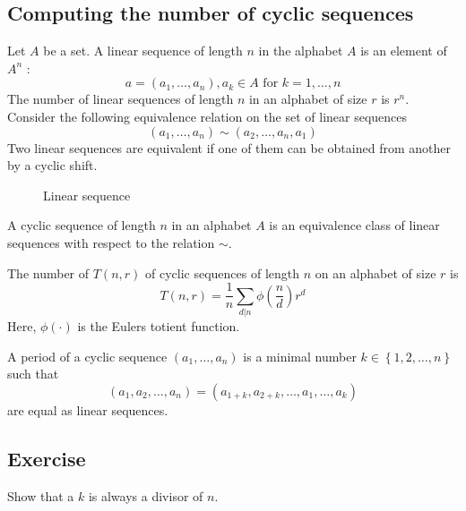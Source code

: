 \documentclass[../main.tex]{subfiles}
\begin{document}
\subsection{Computing the number of cyclic sequences}
\begin{defn}
	Let $A$ be a set. A linear sequence of length $n$ in the alphabet $A$ is an element of $A^{n}$ :
	\[ 
		a= ( a_1, \ldots, a_n) , a_k \in A  \text{ for }  k=1, \ldots,n
	\]
The number of linear sequences of length $n $ in an alphabet of size $r$ is $r^{n}$.\\
Consider the following equivalence relation on the set of linear sequences
\[ 
	( a_1, \ldots, a_n) \sim ( a_2, \ldots, a_n, a_1) 
\]
Two linear sequences are equivalent if one of them can be obtained from another by a cyclic shift.
\end{defn}
\begin{exemple}
\begin{figure}[H]
    \centering
    \caption{Linear sequence}
    \label{fig:linear-sequence}
\end{figure}
\end{exemple}
\begin{defn}
	A cyclic sequence of length $n$ in an alphabet $A$ is an equivalence class of linear sequences with respect to the relation $\sim$.		
\end{defn}
\begin{propo}
	The number of  $T( n, r) $ of cyclic sequences of length $n$ on an alphabet of size $r$ is
	\[ 
		T( n,r)  = \frac{1}{n} \sum_{d|n}^{ } \phi( \frac{n}{d}) r^{d}
	\]
	Here, $\phi( \cdot) $ is the Eulers totient function.
\end{propo}
\begin{defn}
	A period of a cyclic sequence $( a_1, \ldots, a_n) $ is a minimal number $k \in \left\{ 1, 2, \ldots, n \right\}  $ such that 
	\[ 
		( a_1, a_2, \ldots, a_n)  = ( a_{1+k} , a_{2+k} , \ldots, a_1, \ldots, a_k) 
	\]
	are equal as linear sequences.

\end{defn}
\subsection*{Exercise}

Show that a $k$ is always a divisor of $n$.
\end{document}
